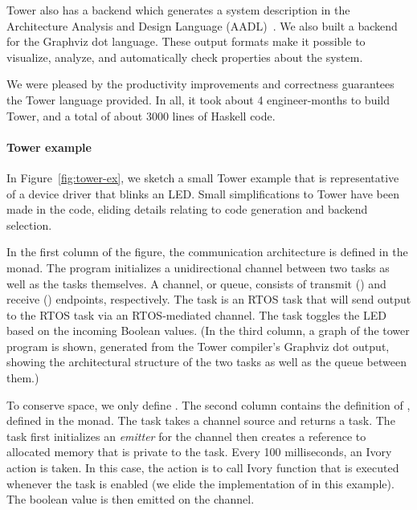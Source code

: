 Tower also has a backend which generates a system description in the Architecture
Analysis and Design Language (AADL)~\cite{SAE:AADL}. We also built a backend for
the Graphviz dot language.  These output formats make it possible to visualize,
analyze, and automatically check properties about the system.

We were pleased by the productivity improvements and correctness guarantees the
Tower language provided. In all, it took about 4 engineer-months to build Tower,
and a total of about 3000 lines of Haskell code.


\paragraph{Tower example}
\label{sec:examples}

In Figure~\ref{fig:tower-ex}, we sketch a small Tower example that is
representative of a device driver that blinks an LED.  Small simplifications to
Tower have been made in the code, eliding details relating to code generation
and backend selection.

In the first column of the figure, the communication
architecture is defined in the  monad.  The program initializes a
unidirectional channel between two tasks as well as the tasks themselves.  A channel, or queue,
consists of transmit () and receive () endpoints, respectively.
The  task is an RTOS task that will send output to the
 RTOS task via an RTOS-mediated channel.  The 
task toggles the LED based on the incoming Boolean values.  (In the third column, a graph of the tower program is shown, generated from the
Tower compiler's Graphviz dot output, showing the architectural structure of the
two tasks as well as the queue between them.)

To conserve space, we only define .  The second column contains
the definition of , defined in the  monad.  The
 task takes a channel source and returns a task.  The
task first initializes an \emph{emitter} for the channel then creates a
reference to allocated memory that is private to the task.  Every 100
milliseconds, an Ivory action is taken.  In this case, the action is to call
Ivory function  that is executed whenever the task is enabled
(we elide the implementation of  in this example).  The
boolean value  is then emitted on the channel.




